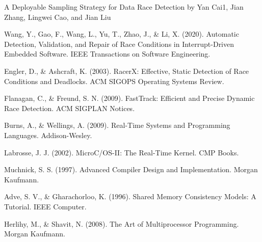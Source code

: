 \documentclass[
fancyheadings, %
%
%
]{stsreprt}
\begin{document}
A Deployable Sampling Strategy for Data Race Detection by Yan Cai1, Jian Zhang, Lingwei Cao, and Jian Liu
\begin{thebibliography}{9}
	Wang, Y., Gao, F., Wang, L., Yu, T., Zhao, J., \& Li, X. (2020). Automatic Detection, Validation, and Repair of Race Conditions in Interrupt-Driven Embedded Software. IEEE Transactions on Software Engineering.
	
	Engler, D., \& Ashcraft, K. (2003). RacerX: Effective, Static Detection of Race Conditions and Deadlocks. ACM SIGOPS Operating Systems Review.
	
	Flanagan, C., \& Freund, S. N. (2009). FastTrack: Efficient and Precise Dynamic Race Detection. ACM SIGPLAN Notices.
	
	Burns, A., \& Wellings, A. (2009). Real-Time Systems and Programming Languages. Addison-Wesley.
	
	Labrosse, J. J. (2002). MicroC/OS-II: The Real-Time Kernel. CMP Books.
	
	Muchnick, S. S. (1997). Advanced Compiler Design and Implementation. Morgan Kaufmann.
	
	Adve, S. V., \& Gharachorloo, K. (1996). Shared Memory Consistency Models: A Tutorial. IEEE Computer.
	
	Herlihy, M., \& Shavit, N. (2008). The Art of Multiprocessor Programming. Morgan Kaufmann.
\end{thebibliography}
\end{document}
